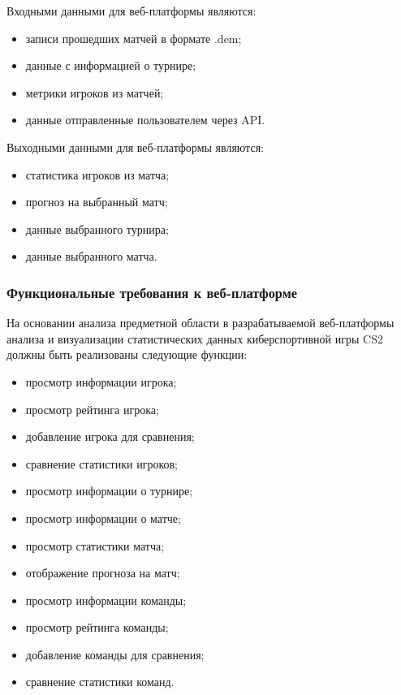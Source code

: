 Входными данными для веб-платформы являются:
\begin{itemize}
	\item записи прошедших матчей в формате .dem;
	\item данные с информацией о турнире;
	\item метрики игроков из матчей;
	\item данные отправленные пользователем через API.
\end{itemize}

Выходными данными для веб-платформы являются:
\begin{itemize}
	\item статистика игроков из матча;
	\item прогноз на выбранный матч;
	\item данные выбранного турнира;
	\item данные выбранного матча.
\end{itemize}

\subsubsection{Функциональные требования к веб-платформе}

На основании анализа предметной области в разрабатываемой веб-платформы анализа и визуализации статистических данных киберспортивной игры CS2 должны быть реализованы следующие функции:
\begin{itemize}
	\item просмотр информации игрока;
	\item просмотр рейтинга игрока;
	\item добавление игрока для сравнения;
	\item сравнение статистики игроков;
	\item просмотр информации о турнире;
	\item просмотр информации о матче;
	\item просмотр статистики матча;
	\item отображение прогноза на матч;
	\item просмотр информации команды;
	\item просмотр рейтинга команды;
	\item добавление команды для сравнения;
	\item сравнение статистики команд.
\end{itemize}

